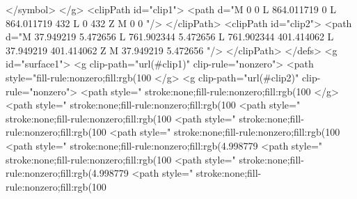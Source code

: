 </symbol>
</g>
<clipPath id="clip1">
  <path d="M 0 0 L 864.011719 0 L 864.011719 432 L 0 432 Z M 0 0 "/>
</clipPath>
<clipPath id="clip2">
  <path d="M 37.949219 5.472656 L 761.902344 5.472656 L 761.902344 401.414062 L 37.949219 401.414062 Z M 37.949219 5.472656 "/>
</clipPath>
</defs>
<g id="surface1">
<g clip-path="url(#clip1)" clip-rule="nonzero">
<path style="fill-rule:nonzero;fill:rgb(100%
</g>
<g clip-path="url(#clip2)" clip-rule="nonzero">
<path style=" stroke:none;fill-rule:nonzero;fill:rgb(100%
</g>
<path style=" stroke:none;fill-rule:nonzero;fill:rgb(100%
<path style=" stroke:none;fill-rule:nonzero;fill:rgb(100%
<path style=" stroke:none;fill-rule:nonzero;fill:rgb(100%
<path style=" stroke:none;fill-rule:nonzero;fill:rgb(100%
<path style=" stroke:none;fill-rule:nonzero;fill:rgb(4.998779%
<path style=" stroke:none;fill-rule:nonzero;fill:rgb(100%
<path style=" stroke:none;fill-rule:nonzero;fill:rgb(4.998779%
<path style=" stroke:none;fill-rule:nonzero;fill:rgb(100%
